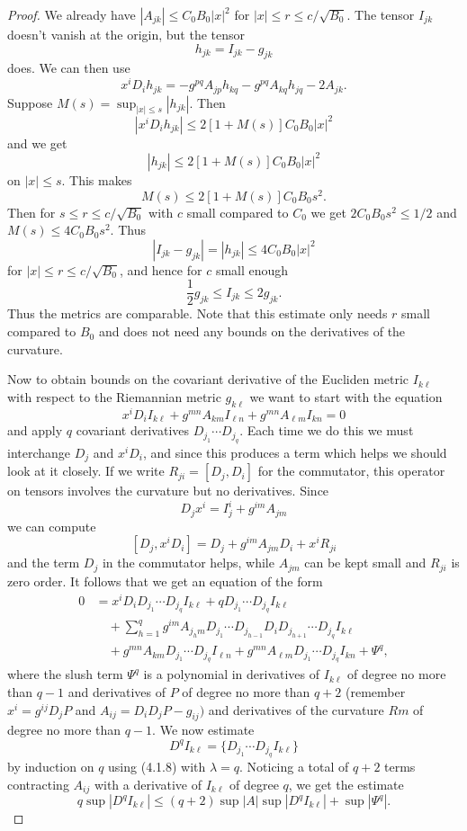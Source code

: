 \begin{proof}
\noindent We already have $|A_{jk}| \leq C_0B_0|x|^2$ for $|x|
\leq r \leq c/ \sqrt{B_0}$. The tensor $I_{jk}$ doesn't vanish at
the origin, but the tensor
$$
h_{jk}=I_{jk}-g_{jk}
$$
does. We can then use
$$
x^iD_ih_{jk}=-g^{pq}A_{jp}h_{kq}-g^{pq}A_{kq}h_{jq}-2A_{jk}.
$$
Suppose $M(s) = \sup_{|x| \leq s}|h_{jk}|$. Then
$$
|x^iD_ih_{jk}| \leq 2[1+M(s)]C_0B_0|x|^2
$$
and we get
$$
|h_{jk}| \leq 2 [1+M(s)]C_0B_0|x|^2
$$
on $|x| \leq s$. This makes
$$
M(s) \leq 2[1+M(s)]C_0B_0s^2.
$$
Then for $s \leq r \leq c/ \sqrt{B_0}$ with $c$ small compared to
$C_0$ we get $2C_0B_0s^2 \leq 1/2$ and $M(s) \leq 4C_0B_0s^2$.
Thus
$$
|I_{jk}-g_{jk}|=|h_{jk}| \leq 4C_0B_0|x|^2
$$
for $|x| \leq r\leq c/ \sqrt{B_0}$, and hence for $c$ small enough
$$
\frac{1}{2} g_{jk} \leq I_{jk} \leq 2g_{jk}.
$$
Thus the metrics are comparable. Note that this estimate only
needs $r$ small compared to $B_0$ and does not need any bounds on
the derivatives of the curvature.

Now to obtain bounds on the covariant derivative of the Eucliden
metric $I_{k \ell}$ with respect to the Riemannian metric $g_{k
\ell}$ we want to start with the equation
$$
x^iD_iI_{k \ell}+g^{mn}A_{km}I_{\ell n}+g^{mn}A_{\ell m}I_{kn}=0
$$
and apply $q$ covariant derivatives $D_{j_1} \cdots D_{j_q}$. Each
time we do this we must interchange $D_j$ and $x^iD_i$, and since
this produces a term which helps we should look at it closely. If
we write $R_{ji}=[D_j,D_i]$ for the commutator, this operator on
tensors involves the curvature but no derivatives. Since
$$
D_jx^i=I^i_j+g^{im}A_{jm}
$$
we can compute
$$
[D_j, x^iD_i]=D_j+g^{im}A_{jm}D_i+x^iR_{ji}
$$
and the term $D_j$ in the commutator helps, while $A_{jm}$ can be
kept small and $R_{ji}$ is zero order. It follows that we get an
equation of the form
\begin{align*}
0 &  = x^iD_iD_{j_1} \cdots D_{j_q}I_{k \ell} + qD_{j_1} \cdots
D_{j_q}I_{k \ell} \\
&\quad  + \sum^q_{h=1} g^{im}A_{j_hm}D_{j_1} \cdots
D_{j_{h-1}}D_iD_{j_{h+1}} \cdots D_{j_q}I_{k \ell} \\
&\quad  + g^{mn}A_{km}D_{j_1} \cdots D_{j_q}I_{\ell n} + g^{mn}
A_{\ell m} D_{j_1} \cdots D_{j_q}I_{kn}+ \Psi^q,
\end{align*}
where the slush term $\Psi^q$ is a polynomial in derivatives of
$I_{k \ell}$ of degree no more than $q-1$ and derivatives of $P$
of degree no more than $q+2$ (remember $x^i = g^{ij}D_jP$ and
$A_{ij} = D_iD_jP-g_{ij})$ and derivatives of the curvature $Rm$
of degree no more than $q-1$. We now estimate
$$
D^qI_{k \ell} = \{D_{j_1} \cdots D_{j_q}I_{k \ell}\}
$$
by induction on $q$ using (4.1.8) with $\lambda = q$. Noticing a
total of $q+2$ terms contracting $A_{ij}$ with a derivative of
$I_{k \ell}$ of degree $q$, we get the estimate
$$
q \sup |D^qI_{k \ell}| \leq (q+2) \operatorname{sup}|A|
\operatorname{sup} |D^q I_{k \ell} | + \operatorname{sup} |
\Psi^q|.
$$


\end{proof}
